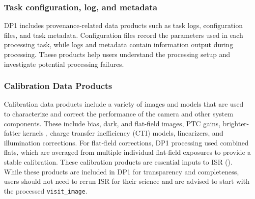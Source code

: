 \subsubsection{Task configuration, log, and metadata}
\gls{DP1} includes \gls{provenance}-related data products such as task logs, \gls{configuration} files, and task metadata.
Configuration files record the parameters used in each processing task, while logs and \gls{metadata} contain information output during processing.
These products help users understand the processing setup and investigate potential processing failures.

\subsubsection{Calibration Data Products}
\label{ssec:calibration_data}
Calibration data products include a variety of images and models that are used to characterize and correct the performance of the camera and other system components.
These include bias, dark, and flat-field images, \gls{PTC} gains, brighter-fatter kernels \citep{2014JInst...9C3048A}, charge transfer inefficiency (\gls{CTI}) models, linearizers, and illumination corrections.
For flat-field corrections, \gls{DP1} processing used combined flats, which are averaged from multiple individual flat-field exposures to provide a stable \gls{calibration}. These \gls{calibration} products are essential inputs to \gls{ISR} (). While these products are included in \gls{DP1} for transparency and completeness, users should not need to rerun ISR for their science and are advised to start with the processed \texttt{visit\_image}.

